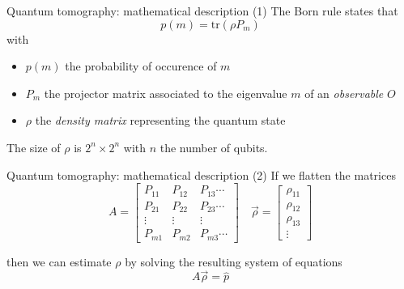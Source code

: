 \documentclass{beamer}
\newcommand{\tr}{\text{tr}}
\begin{document}
\begin{frame}{Quantum tomography: mathematical description (1)}
    The Born rule states that
    \begin{equation}
        p(m) = \tr(\rho P_m)
    \end{equation}
    with
    \begin{itemize}
        \item $p(m)$ the probability of occurence  of $m$
        \item $P_m$ the projector matrix associated to the eigenvalue $m$ of an \textit{observable} $O$
        \item $\rho$ the \textit{density matrix} representing the quantum state 
    \end{itemize}\medbreak
    The size of $\rho$ is  $2^n \times 2^n$ with $n$ the number of qubits.
\end{frame}
\begin{frame}{Quantum tomography: mathematical description (2)}
    If we flatten the matrices
    \begin{equation}
        A = \begin{bmatrix}
            P_{11} & P_{12} & P_{13} \cdots\\
            P_{21} & P_{22} & P_{23} \cdots\\
            \vdots & \vdots & \vdots \\
            P_{m1} & P_{m2} & P_{m3} \cdots
        \end{bmatrix}
        \quad\vec{\rho} = \begin{bmatrix}
            \rho_{11} \\
            \rho_{12} \\
            \rho_{13} \\
            \vdots
        \end{bmatrix}
    \end{equation}

    then we can estimate $\rho$ by solving the resulting system of equations 
    \begin{equation}
        A\vec{\rho} = \hat p
    \end{equation}
\end{frame}
\end{document}
